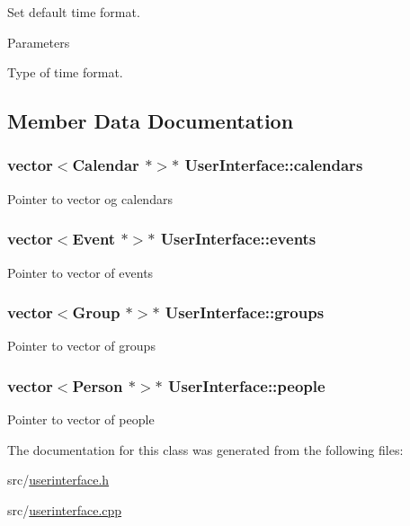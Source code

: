 \label{df/de1/classUserInterface_a36513fcf018fafc53726cf610f46571f}
Set default time format. 
\begin{DoxyParams}{Parameters}
\item[\mbox{\tt[in]} {\em format}]Type of time format. \end{DoxyParams}


\subsection{Member Data Documentation}
\hypertarget{classUserInterface_abd1f3233d3e666415f6cdf8458b50faa}{
\subsubsection[{calendars}]{\setlength{\rightskip}{0pt plus 5cm}vector$<${\bf Calendar} $\ast$$>$$\ast$ {\bf UserInterface::calendars}}}
\label{df/de1/classUserInterface_abd1f3233d3e666415f6cdf8458b50faa}
Pointer to vector og calendars \hypertarget{classUserInterface_ae3370dc0d02c19b4b1cc7c47221c2bfa}{
\subsubsection[{events}]{\setlength{\rightskip}{0pt plus 5cm}vector$<${\bf Event} $\ast$$>$$\ast$ {\bf UserInterface::events}}}
\label{df/de1/classUserInterface_ae3370dc0d02c19b4b1cc7c47221c2bfa}
Pointer to vector of events \hypertarget{classUserInterface_a12676e629660c43c63eb5b01c5c19bc3}{
\subsubsection[{groups}]{\setlength{\rightskip}{0pt plus 5cm}vector$<${\bf Group} $\ast$$>$$\ast$ {\bf UserInterface::groups}}}
\label{df/de1/classUserInterface_a12676e629660c43c63eb5b01c5c19bc3}
Pointer to vector of groups \hypertarget{classUserInterface_a3d0914e9d2ba661bc3691397c695287e}{
\subsubsection[{people}]{\setlength{\rightskip}{0pt plus 5cm}vector$<${\bf Person} $\ast$$>$$\ast$ {\bf UserInterface::people}}}
\label{df/de1/classUserInterface_a3d0914e9d2ba661bc3691397c695287e}
Pointer to vector of people 

The documentation for this class was generated from the following files:\begin{DoxyCompactItemize}
\item 
src/\hyperlink{userinterface_8h}{userinterface.h}\item 
src/\hyperlink{userinterface_8cpp}{userinterface.cpp}\end{DoxyCompactItemize}
